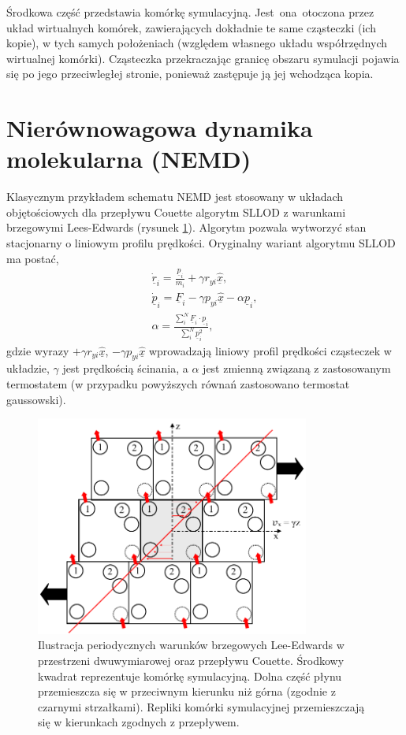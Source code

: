 \documentclass[12pt,a4paper,openright]{report} %
\begin{document}
Środkowa część przedstawia komórkę symulacyjną. Jest~ona~otoczona przez układ wirtualnych komórek, zawierających dokładnie te same cząsteczki (ich kopie), w tych samych położeniach (względem własnego układu współrzędnych wirtualnej komórki). Cząsteczka przekraczając granicę obszaru symulacji pojawia się po jego przeciwległej stronie, ponieważ zastępuje ją jej wchodząca kopia.
%
\section{Nierównowagowa dynamika molekularna (NEMD)}
%
Klasycznym przykładem schematu NEMD jest stosowany w układach objętościowych dla przepływu Couette algorytm SLLOD \cite{EvansMoris1990} z warunkami brzegowymi Lees-Edwards (rysunek \ref{period_war_brz_LE}). Algorytm pozwala wytworzyć stan stacjonarny o liniowym profilu prędkości. Oryginalny wariant algorytmu SLLOD ma postać,
\begin{equation}
\begin{gathered}
\underline{\dot{r}}_i=\frac{\underline{p}_i}{m_i}+\gamma r_{yi} \underline{\hat{x}}, \\
\underline{\dot{p}}_i=\underline{F}_i -\gamma p_{yi} \underline{\hat{x}} - \alpha\underline{p}_i, \\
\alpha=\frac{\sum_i^N \underline{F}_i \cdot \underline{p}_i}{\sum_i^N \underline{p}_i^2},
\end{gathered}
\end{equation}   
%
gdzie wyrazy $+\gamma r_{yi} \underline{\hat{x}}$, $-\gamma p_{yi} \underline{\hat{x}}$ wprowadzają liniowy profil prędkości cząsteczek w układzie, $\gamma$ jest prędkością ścinania, a $\alpha$ jest zmienną związaną z zastosowanym termostatem (w przypadku powyższych równań zastosowano termostat gaussowski).
\begin{figure}[h]
\centering
\includegraphics[width=90mm]{rysunki/PBC_LE.pdf}
\caption{Ilustracja periodycznych warunków brzegowych Lee-Edwards w przestrzeni dwuwymiarowej oraz przepływu Couette. Środkowy kwadrat reprezentuje komórkę symulacyjną. Dolna część płynu przemieszcza się w przeciwnym kierunku niż górna (zgodnie z czarnymi strzałkami). Repliki komórki symulacyjnej przemieszczają się w kierunkach zgodnych z przepływem.}
\label{period_war_brz_LE}
\end{figure}
\end{document}
